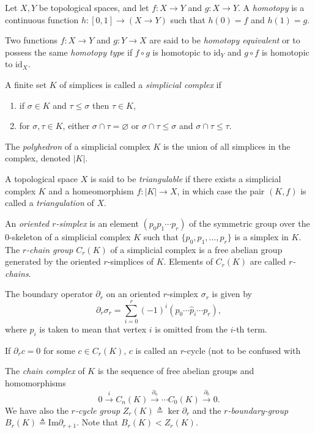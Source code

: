 \begin{defn}
Let $X, Y$ be topological spaces, and let $f : X \to Y$ and
$g : X \to Y$. A \emph{homotopy} is a continuous function
$h : [0,1] \to (X \to Y)$ such that $h(0) = f$ and $h(1) = g$.

Two functions $f : X \to Y$ and $g : Y \to X$ are said to be
\emph{homotopy equivalent} or to possess the same \emph{homotopy type}
if $f \circ g$ is homotopic to $\mathrm{id}_Y$ and $g \circ f$ is
homotopic to
$\mathrm{id}_X$.
\end{defn}

\begin{defn}
A finite set $K$ of simplices is called a \emph{simplicial complex} if
\begin{enumerate}
  \item{if $\sigma \in K$ and $\tau \leq \sigma$ then
        $\tau \in K$,}
  \item{for $\sigma, \tau \in K$, either $\sigma \cap \tau =
      \varnothing$ or $\sigma \cap \tau \leq \sigma$ and $\sigma \cap
      \tau \leq \tau$.
       }
\end{enumerate}
\end{defn}

\begin{defn}
The \emph{polyhedron} of a simplicial complex $K$ is the union of all
simplices in the complex, denoted $|K|$.

A topological space $X$ is
said to be \emph{triangulable} if there exists a simplicial complex
$K$ and a homeomorphism $f : |K| \to X$, in which case the pair
$(K, f)$ is called a \emph{triangulation} of $X$.
\end{defn}

\begin{defn}
An \emph{oriented $r$-simplex} is an element
$(p_0 p_1 \cdots p_r)$ of the symmetric group
over the $0$-skeleton of a simplicial complex $K$ such that
$\{p_0, p_1, \dots, p_r\}$ is a simplex in $K$. The
\emph{$r$-chain group} $C_r(K)$ of a simplicial complex is a free
abelian group generated by the oriented $r$-simplices of $K$. Elements
of $C_r(K)$ are called \emph{$r$-chains}.
\end{defn}

\begin{defn}
The boundary operator $\partial_r$ on an oriented $r$-simplex
$\sigma_r$ is given by
$$
\partial_r \sigma_r
= \sum_{i = 0}^r (-1)^i(p_0 \cdots \hat{p}_i \cdots p_r),
$$
where $\hat{p}_i$ is taken to mean that vertex $i$ is omitted from the
$i$-th term.

If $\partial_r c = 0$ for some $c \in C_r(K)$, $c$ is called an
$r$-cycle (not to be confused with

The \emph{chain complex} of $K$ is the sequence of
free abelian groups and homomorphisms
$$
0      \xrightarrow{i}
C_n(K) \xrightarrow{\partial_n}
\cdots
C_0(K) \xrightarrow{\partial_0}
0.
$$
We have also the \emph{$r$-cycle group}
$Z_r(K) \triangleq \ker \partial_r$ and the
\emph{$r$-boundary-group}
$B_r(K) \triangleq \mathrm{Im} \partial_{r+1}$. Note that
$B_r(K) < Z_r(K)$.
\end{defn}

